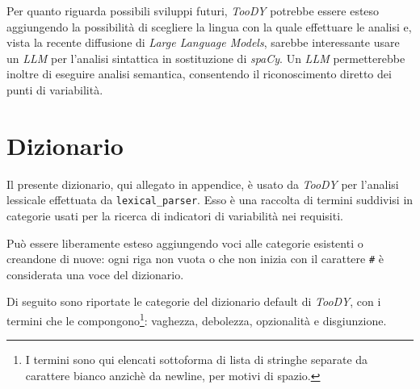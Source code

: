 \documentclass[12pt]{report}
\newcommand{\toody}{\textsl{TooDY}\xspace}
\newcommand{\spacy}{\textsl{spaCy}\xspace}
\begin{document}
Per quanto riguarda possibili \textsf{sviluppi futuri}, \toody potrebbe essere esteso aggiungendo la possibilità di scegliere la lingua con la quale effettuare le analisi e, vista la recente diffusione di \textit{Large Language Models}, sarebbe interessante usare un \textsl{LLM} per l'analisi sintattica in sostituzione di \spacy. Un \textsl{LLM} permetterebbe inoltre di eseguire analisi semantica, consentendo il riconoscimento diretto dei punti di variabilità.




\appendix
\chapter{Dizionario}
\label{app:dizionario}
Il presente dizionario, qui allegato in appendice, è usato da \toody per l'analisi lessicale effettuata da \texttt{lexical\_parser}. Esso è una raccolta di termini suddivisi in categorie usati per la ricerca di indicatori di variabilità nei requisiti.

Può essere liberamente esteso aggiungendo voci alle categorie esistenti o creandone di nuove: ogni riga non vuota o che non inizia con il carattere \texttt{\#} è considerata una voce del dizionario.

Di seguito sono riportate le categorie del dizionario default di \toody, con i termini che le compongono\footnote{I termini sono qui elencati sottoforma di lista di stringhe separate da carattere bianco anzichè da newline, per motivi di spazio.}: vaghezza, debolezza, opzionalità e disgiunzione.
\end{document}
